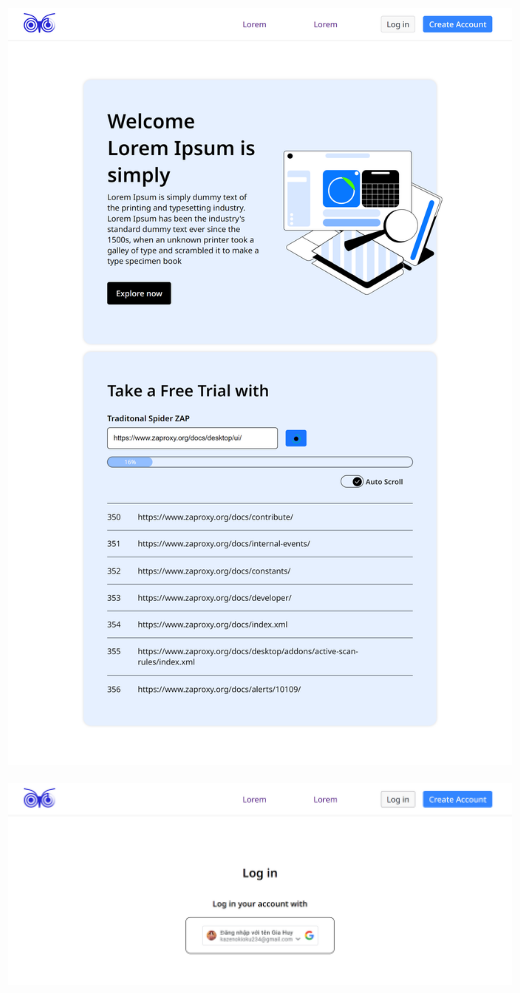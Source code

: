 \includegraphics[width=\textwidth]{images/prototype/prototype_22112022/home_scanning.png}

\includegraphics[width=\textwidth]{images/prototype/prototype_22112022/login.png}

\vspace{5cm}

